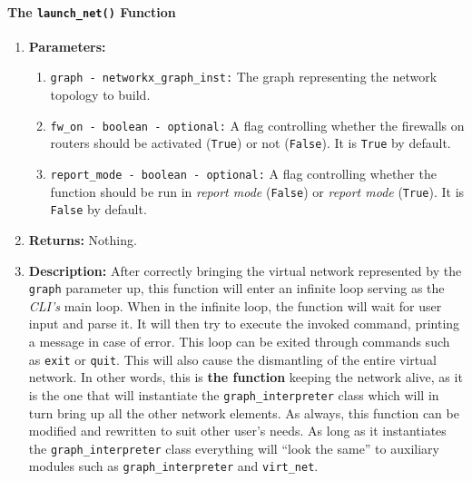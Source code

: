     \paragraph{The \texttt{launch\_net()} Function}
        \begin{enumerate}
            \item \textbf{Parameters:}
            \begin{enumerate}
                \item \texttt{graph - networkx\_graph\_inst:} The graph representing the network topology to build.
                \item \texttt{fw\_on - boolean - optional:} A flag controlling whether the firewalls on routers should be activated (\texttt{True}) or not (\texttt{False}). It is \texttt{True} by default.
                \item \texttt{report\_mode - boolean - optional:} A flag controlling whether the function should be run in \textit{report mode} (\texttt{False}) or \textit{report mode} (\texttt{True}). It is \texttt{False} by default.
            \end{enumerate}
            \item \textbf{Returns:} Nothing.
            \item \textbf{Description:} After correctly bringing the virtual network represented by the \texttt{graph} parameter up, this function will enter an infinite loop serving as the \textit{CLI's} main loop. When in the infinite loop, the function will wait for user input and parse it. It will then try to execute the invoked command, printing a message in case of error. This loop can be exited through commands such as \texttt{exit} or \texttt{quit}. This will also cause the dismantling of the entire virtual network. In other words, this is \textbf{the function} keeping the network alive, as it is the one that will instantiate the \texttt{graph\_interpreter} class which will in turn bring up all the other network elements. As always, this function can be modified and rewritten to suit other user's needs. As long as it instantiates the \texttt{graph\_interpreter} class everything will ``look the same'' to auxiliary modules such as \texttt{graph\_interpreter} and \texttt{virt\_net}.
        \end{enumerate}
